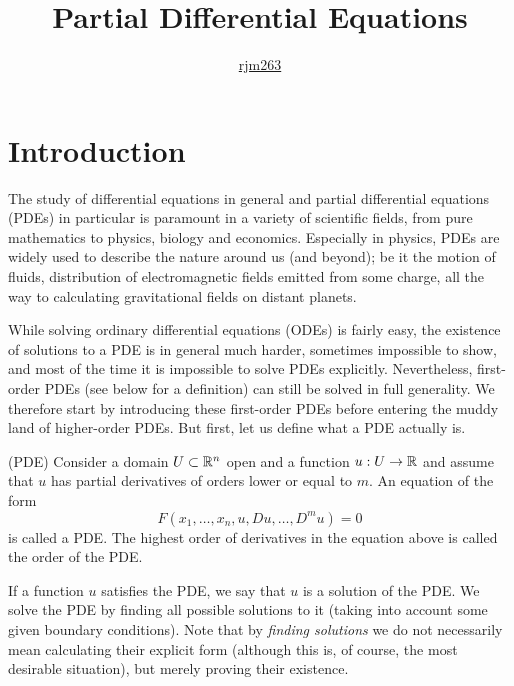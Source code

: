 \documentclass[11pt]{article}
\title{\boldmath Partial Differential Equations}
\author{\href{https://github.com/rjm263}{rjm263}}
\begin{document}
	
	\maketitle
	\flushbottom    
	\newpage


    \section{Introduction}

		The study of differential equations in general and partial differential equations (PDEs) in particular is paramount in a variety of scientific fields, from pure mathematics to physics, biology and economics. Especially in physics, PDEs are widely used to describe the nature around us (and beyond); be it the motion of fluids, distribution of electromagnetic fields emitted from some charge, all the way to calculating gravitational fields on distant planets. 
		
		While solving ordinary differential equations (ODEs) is fairly easy, the existence of solutions to a PDE is in general much harder, sometimes impossible to show, and most of the time it is impossible to solve PDEs explicitly. Nevertheless, first-order PDEs (see below for a definition) can still be solved in full generality. We therefore start by introducing these first-order PDEs before entering the muddy land of higher-order PDEs. But first, let us define what a PDE actually is. 
		
		\begin{defi}
			(PDE) Consider a domain $U\subset\mathbb{R}^n$ open and a function $u:U\rightarrow\mathbb{R}$ and assume that $u$ has partial derivatives of orders lower or equal to $m$. An equation of the form 
			\begin{equation*}
				F(x_1,\dots,x_n,u,Du,\dots,D^mu)=0
			\end{equation*}
			is called a PDE. The highest order of derivatives in the equation above is called the order of the PDE. 
		\end{defi}
		If a function $u$ satisfies the PDE, we say that $u$ is a solution of the PDE. We solve the PDE by finding all possible solutions to it (taking into account some given boundary conditions). Note that by \textit{finding solutions} we do not necessarily mean calculating their explicit form (although this is, of course, the most desirable situation), but merely proving their existence.
\end{document}
